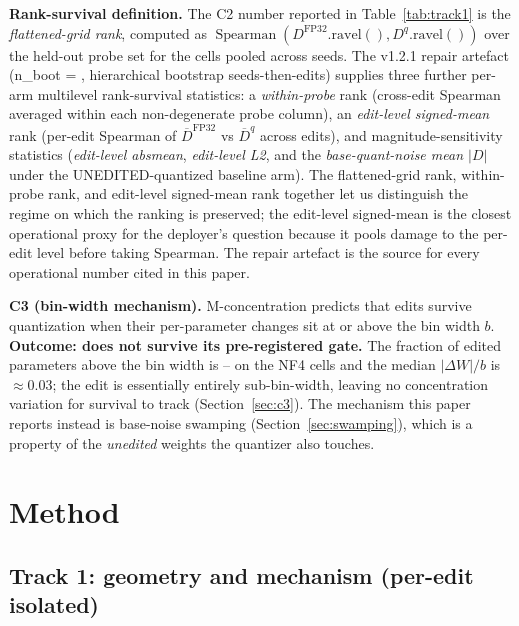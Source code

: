 \documentclass[preprint,12pt]{elsarticle}
\begin{document}
\textbf{Rank-survival definition.} The C2 number reported in
Table~\ref{tab:track1} is the \emph{flattened-grid rank}, computed as
$\operatorname{Spearman}(D^{\mathrm{FP32}}.\mathrm{ravel}(),
D^{q}.\mathrm{ravel}())$ over the held-out probe set for the cells pooled across
seeds. The v1.2.1 repair
artefact (n\_boot = \pRepairNBoot{},
hierarchical bootstrap seeds-then-edits) supplies three further per-arm
multilevel rank-survival statistics: a \emph{within-probe} rank (cross-edit
Spearman averaged within each non-degenerate probe column), an \emph{edit-level
signed-mean} rank (per-edit Spearman of $\overline{D}^{\mathrm{FP32}}$ vs
$\overline{D}^{q}$ across edits), and magnitude-sensitivity statistics
(\emph{edit-level absmean}, \emph{edit-level L2}, and the
\emph{base-quant-noise mean $|D|$} under the UNEDITED-quantized baseline arm).
The flattened-grid rank, within-probe rank, and edit-level signed-mean rank
together let us distinguish the regime on which the ranking is preserved; the
edit-level signed-mean is the closest operational proxy for the deployer's
question because it pools damage to the per-edit level before taking Spearman.
The repair artefact is the source for every operational number cited in this
paper.

\textbf{C3 (bin-width mechanism).} M-concentration predicts that edits survive
quantization when their per-parameter changes sit at or above the bin width $b$.
\textbf{Outcome: does not survive its pre-registered gate.} The fraction of edited parameters above the bin width is
\pKthreeFaboveMin{}--\pKthreeFaboveMax{} on the NF4 cells and the median $|\Delta W|/b$
is $\approx 0.03$; the edit is essentially entirely sub-bin-width, leaving no
concentration variation for survival to track (Section~\ref{sec:c3}). The mechanism this
paper reports instead is base-noise swamping (Section~\ref{sec:swamping}), which is a
property of the \emph{unedited} weights the quantizer also touches.

\section{Method}
\label{sec:method}

\subsection{Track 1: geometry and mechanism (per-edit isolated)}
\label{sec:method-track1}
\end{document}

